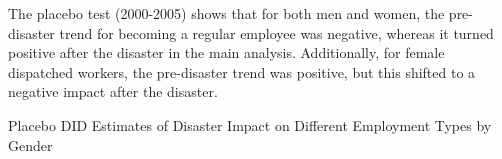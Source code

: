 \documentclass[serif, aspectratio=169]{beamer}
\newcommand{\returnbutton}[2]{%
  \vspace{-1.0cm}  %
  \hfill  %
  \hyperlink{#1}{%
    {\footnotesize\beamerbutton{#2}}%
  }%
  \vspace{0.3cm}  %
}
\begin{document}
\begin{frame}[label=different_types_placebo]

The placebo test (2000-2005) shows that for both men and women, the pre-disaster trend for becoming a regular employee was negative, whereas it turned positive after the disaster in the main analysis. Additionally, for female dispatched workers, the pre-disaster trend was positive, but this shifted to a negative impact after the disaster. 

\vspace{-1.5cm}
\returnbutton{different_types}{Return}
\vspace{2.6cm}

\begin{table}[htbp]
\centering
\caption{Placebo DID Estimates of Disaster Impact on Different Employment Types by Gender}

\vspace{-0.2cm}


\end{table}
\end{frame}
\end{document}
